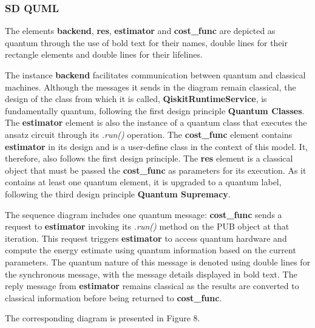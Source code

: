 \documentclass{article}
\begin{document}
\subsubsection{SD QUML}

The elements \textbf{backend}, \textbf{res}, \textbf{estimator} and \textbf{cost\_func} are depicted as quantum through the use of bold text for their names, double lines for their rectangle elements and double lines for their lifelines. 

The instance \textbf{backend} facilitates communication between quantum and classical machines. Although the messages it sends in the diagram remain classical, the design of the class from which it is called, \textbf{QiskitRuntimeService}, is fundamentally quantum, following the first design principle \textbf{Quantum Classes}. The \textbf{estimator} element is also the instance of a quantum class that executes the ansatz circuit through its \textit{.run()} operation. The \textbf{cost\_func} element contains \textbf{estimator} in its design and is a user-define class in the context of this model. It, therefore, also follows the first design principle. The \textbf{res} element is a classical object that must be passed the \textbf{cost\_func} as parameters for its execution. As it contains at least one quantum element, it is upgraded to a quantum label, following the third design principle \textbf{Quantum Supremacy}. 

The sequence diagram includes one quantum message: \textbf{cost\_func} sends a request to \textbf{estimator} invoking its \textit{.run()} method on the PUB object at that iteration. This request triggers \textbf{estimator} to access quantum hardware and compute the energy estimate using quantum information based on the current parameters. The quantum nature of this message is denoted using double lines for the synchronous message, with the message details displayed in bold text. The reply message from \textbf{estimator} remains classical as the results are converted to classical information before being returned to \textbf{cost\_func}.

The corresponding diagram is presented in Figure 8.
\end{document}
